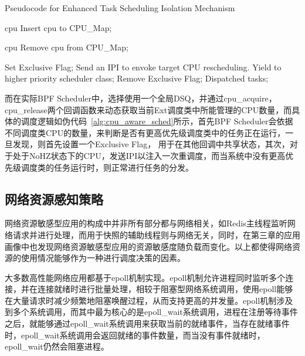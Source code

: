 \begin{algorithm}
    \caption{Pseudocode for Enhanced Task Scheduling Isolation Mechanism}
    \label{alg:cpu_aware_sched}
    \begin{algorithmic}[1]
    
     {cpu}
    \State Insert cpu to CPU\_Map;
    \EndFunction
    
     {cpu}
    \State Remove cpu from CPU\_Map;
    \EndFunction
    
                \State Set Exclusive Flag;
                    \State Send an IPI to envoke target CPU rescheduling.
                \EndFor
                \State Yield to higher priority scheduler class;
            \EndIf
            \State Remove Exclusive Flag;
            \State Dispatched tasks;
        \EndWhile
    \EndFunction
    \end{algorithmic}
\end{algorithm}

而在实际BPF Scheduler中，选择使用一个全局DSQ，并通过cpu\_acquire，cpu\_release两个回调函数来动态获取当前Ext调度类中所能管理的CPU数量，而具体的调度逻辑如伪代码~\ref{alg:cpu_aware_sched}所示，首先BPF Scheduler会依据不同调度类CPU的数量，来判断是否有更高优先级调度类中的任务正在运行，一旦发现，则首先设置一个Exclusive Flag， 用于在其他回调中共享状态，其次，对于处于NoHZ状态下的CPU，发送IPI以注入一次重调度，而当系统中没有更高优先级调度类的任务运行时，则正常进行任务的分发。

\subsection{网络资源感知策略}


网络资源敏感型应用的构成中并非所有部分都与网络相关，如Redis主线程监听网络请求并进行处理，而用于快照的辅助线程则与网络无关，同时，在第三章的应用画像中也发现网络资源敏感型应用的资源敏感度随负载而变化。以上都使得网络资源的使用情况能够作为一种进行调度决策的因素。

大多数高性能网络应用都基于epoll机制实现。epoll机制允许进程同时监听多个连接，并在连接就绪时进行批量处理，相较于阻塞型网络系统调用，使用epoll能够在大量请求时减少频繁地阻塞唤醒过程，从而支持更高的并发量。epoll机制涉及到多个系统调用，而其中最为核心的是epoll\_wait系统调用，进程在注册等待事件之后，就能够通过epoll\_wait系统调用来获取当前的就绪事件，当存在就绪事件时，epoll\_wait系统调用会返回就绪的事件数量，而当没有事件就绪时，epoll\_wait仍然会阻塞进程。

